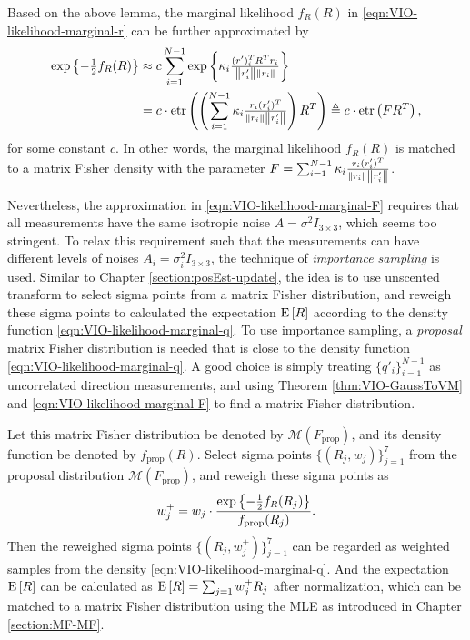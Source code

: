 Based on the above lemma, the marginal likelihood $f_R(R)$ in \eqref{eqn:VIO-likelihood-marginal-r} can be further approximated by
\begin{align} \label{eqn:VIO-likelihood-marginal-F}
	\exp\left\{ -\tfrac{1}{2}f_R(R) \right\} &\approx c \sum_{i=1}^{N-1} \exp\left\{ \kappa_i \tfrac{(r')_i^TR^Tr_i}{\left\| r'_i \right\|\left\| r_i \right\|} \right\} \nonumber \\ 
	&= c \cdot \mathrm{etr}\left( \left(\sum_{i=1}^{N-1} \kappa_i \tfrac{r_i(r'_i)^T}{\left\| r_i \right\|\left\| r'_i \right\|}\right) R^T \right) \triangleq c \cdot \mathrm{etr}\left( FR^T \right),
\end{align}
for some constant $c$.
In other words, the marginal likelihood $f_R(R)$ is matched to a matrix Fisher density with the parameter $F = \sum_{i=1}^{N-1} \kappa_i \tfrac{r_i(r'_i)^T}{\left\| r_i \right\|\left\| r'_i \right\|}$.

Nevertheless, the approximation in \eqref{eqn:VIO-likelihood-marginal-F} requires that all measurements have the same isotropic noise $A = \sigma^2I_{3\times 3}$, which seems too stringent.
To relax this requirement such that the measurements can have different levels of noises $A_i = \sigma_i^2 I_{3\times 3}$, the technique of \textit{importance sampling} is used.
Similar to Chapter \ref{section:posEst-update}, the idea is to use unscented transform to select sigma points from a matrix Fisher distribution, and reweigh these sigma points to calculated the expectation $\mathrm{E}\left[ R \right]$ according to the density function \eqref{eqn:VIO-likelihood-marginal-q}.
To use importance sampling, a \textit{proposal} matrix Fisher distribution is needed that is close to the density function \eqref{eqn:VIO-likelihood-marginal-q}.
A good choice is simply treating $\{q'_i\}_{i=1}^{N-1}$ as uncorrelated direction measurements, and using Theorem \ref{thm:VIO-GaussToVM} and \eqref{eqn:VIO-likelihood-marginal-F} to find a matrix Fisher distribution.

Let this matrix Fisher distribution be denoted by $\mathcal{M}(F_\text{prop})$, and its density function be denoted by $f_\text{prop}(R)$.
Select sigma points \cite{gilitschenski2015unscented,lee2018bayesian} $\{(R_j,w_j)\}_{j=1}^7$ from the proposal distribution $\mathcal{M}(F_\text{prop})$, and reweigh these sigma points as
\begin{align} \label{eqn:VIO-update-sigmapoints}
	w_j^+ = w_j \cdot \frac{\exp\left\{ -\tfrac{1}{2}f_R(R_j) \right\}}{f_\text{prop}(R_j)}.
\end{align}
Then the reweighed sigma points $\{(R_j,w_j^+)\}_{j=1}^7$ can be regarded as weighted samples from the density \eqref{eqn:VIO-likelihood-marginal-q}.
And the expectation $\mathrm{E}\left[ R \right]$ can be calculated as $\mathrm{E}\left[ R \right] = \sum_{j=1} w_j^+R_j$ after normalization, which can be matched to a matrix Fisher distribution using the MLE as introduced in Chapter \ref{section:MF-MF}.

